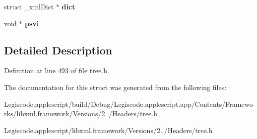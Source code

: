 \begin{DoxyCompactItemize}
\item 
\hypertarget{struct__xml_doc_a6aeb8db4204b026b2b6e3f929c93cce3}{struct \-\_\-xml\-Dict $\ast$ {\bfseries dict}}\label{struct__xml_doc_a6aeb8db4204b026b2b6e3f929c93cce3}

\item 
\hypertarget{struct__xml_doc_ab2ccdd867c2228625f8a008c1b912002}{void $\ast$ {\bfseries psvi}}\label{struct__xml_doc_ab2ccdd867c2228625f8a008c1b912002}

\end{DoxyCompactItemize}


\subsection{Detailed Description}


Definition at line 493 of file tree.\-h.



The documentation for this struct was generated from the following files\-:\begin{DoxyCompactItemize}
\item 
Legiscode.\-applescript/build/\-Debug/\-Legiscode.\-applescript.\-app/\-Contents/\-Frameworks/libxml.\-framework/\-Versions/2../\-Headers/tree.\-h\item 
Legiscode.\-applescript/libxml.\-framework/\-Versions/2../\-Headers/tree.\-h\end{DoxyCompactItemize}

